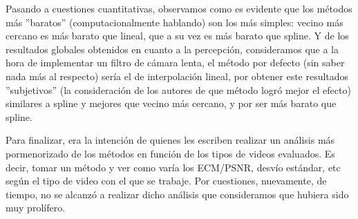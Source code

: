 \par Pasando a cuestiones cuantitativas, observamos como es evidente que los
m\'etodos m\'as ''baratos'' (computacionalmente hablando) son los m\'as
simples: vecino m\'as cercano es m\'as barato que lineal, que a su vez es m\'as
barato que spline. Y de los resultados globales obtenidos en cuanto a la
percepci\'on, consideramos que a la hora de implementar un filtro de c\'amara
lenta, el m\'etodo por defecto (sin saber nada m\'as al respecto) ser\'ia el de
interpolaci\'on lineal, por obtener este resultados ''subjetivos'' (la
consideraci\'on de los autores de que m\'etodo logr\'o mejor el efecto)
similares a spline y mejores que vecino m\'as cercano, y por ser m\'as barato
que spline.

\par Para finalizar, era la intenci\'on de quienes les escriben realizar un
an\'alisis m\'as pormenorizado de los m\'etodos en funci\'on de los tipos de
videos evaluados. Es decir, tomar un m\'etodo y ver como var\'ia los ECM/PSNR,
desv\'io est\'andar, etc seg\'un el tipo de video con el que se trabaje. Por
cuestiones, nuevamente, de tiempo, no se alcanz\'o a realizar dicho an\'alisis
que consideramos que hubiera sido muy prol\'ifero.
